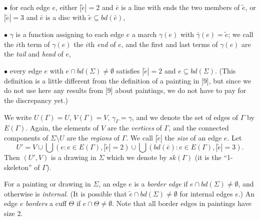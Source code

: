 \hspace*{12pt}$\bullet$ for each edge $e$, either $|\tilde{e}| = 2$ and $\bar{e}$ is a line with ends the two members of $\tilde{e}$, or $|\tilde{e}| = 3$ and $\bar{e}$ is a disc with $\tilde{e} \subseteq bd(\bar{e})$,

\hspace*{12pt}$\bullet$ $\gamma$ is a function assigning to each edge $e$ a march $\gamma(e)$ with $\bar{\gamma}(e) = \tilde{e}$; we call the $i$th term of $\gamma(e)$ the $i$th \textit{end} of $e$, and the first and last terms of $\gamma(e)$ are the \textit{tail} and \textit{head} of $e$,

\hspace*{12pt}$\bullet$ every edge $e$ with $e \cap bd(\Sigma) \ne \emptyset$ satisfies $|\tilde{e}| = 2$ and $e \subseteq bd(\Sigma)$. (This definition is a little different from the definition of a painting in [9], but since we do not use here any results from [9] about paintings, we do not have to pay for the discrepancy yet.)

We write $U(\Gamma) = U$, $V(\Gamma) = V$, $\gamma_{\Gamma} = \gamma$, and we denote the set of edges of $\Gamma$ by $E(\Gamma)$. Again, the elements of $V$ are the \textit{vertices} of $\Gamma$, and the connected components of $\Sigma \setminus U$ are the \textit{regions} of $\Gamma$. We call $|\tilde{e}|$ the \textit{size} of an edge $e$. Let
\begin{equation*}
U' = V \cup \bigcup (e : e \in E(\Gamma), |\tilde{e}| = 2) \cup \bigcup (bd(\bar{e}) : e \in E(\Gamma), |\tilde{e}| = 3).
\end{equation*}
Then $(U', V)$ is a drawing in $\Sigma$ which we denote by $sk(\Gamma)$ (it is the ``1-skeleton'' of $\Gamma$).

For a painting or drawing in $\Sigma$, an edge $e$ is a \textit{border edge} if $e \cap bd(\Sigma) \ne \emptyset$, and otherwise is \textit{internal}. (It is possible that $\tilde{e} \cap bd(\Sigma) \ne \emptyset$ for internal edges $e$.) An edge $e$ \textit{borders} a cuff $\Theta$ if $e \cap \Theta \ne \emptyset$. Note that all border edges in paintings have size 2.
